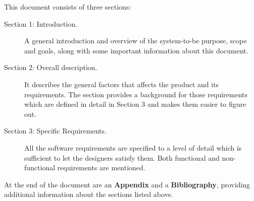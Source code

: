 This document consists of three sections:

\begin{description}
\item[Section 1: Introduction.] A general introduction and overview of the system-to-be purpose, scope and goals, along with some important information about this document.
\item[Section 2: Overall description.] It describes the general factors that affects the product and its requirements. The section provides a background for those requirements which are defined in detail in Section 3 and makes them easier to figure out.
\item[Section 3: Specific Requirements.] All the software requirements are specified to a level of detail which is sufficient to let the designers satisfy them. Both functional and non-functional requirements are mentioned.
\end{description}
At the end of the document are an \textbf{Appendix} and a \textbf{Bibliography}, providing additional information about the sections listed above.